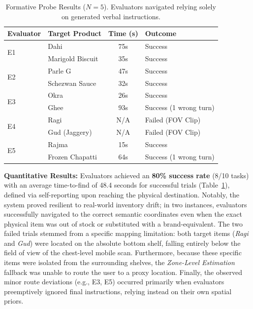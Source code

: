 \documentclass[sigconf,anonymous,review]{acmart}
\begin{document}
\begin{table}[h]
\centering
\caption{Formative Probe Results ($N=5$). Evaluators navigated relying solely on generated verbal instructions.}
\label{tab:user_study}
\small
\begin{tabular}{llcl}
\toprule
\textbf{Evaluator} & \textbf{Target Product} & \textbf{Time (s)} & \textbf{Outcome} \\
\midrule
\multirow{2}{*}{E1} & Dahi             & 75s & Success \\
                    & Marigold Biscuit & 35s & Success \\
\midrule
\multirow{2}{*}{E2} & Parle G          & 47s & Success \\
                    & Schezwan Sauce   & 32s & Success \\
\midrule
\multirow{2}{*}{E3} & Okra             & 26s & Success \\
                    & Ghee             & 93s & Success (1 wrong turn) \\
\midrule
\multirow{2}{*}{E4} & Ragi             & N/A & Failed (FOV Clip) \\
                    & Gud (Jaggery)    & N/A & Failed (FOV Clip) \\
\midrule
\multirow{2}{*}{E5} & Rajma            & 15s & Success \\
                    & Frozen Chapatti  & 64s & Success (1 wrong turn) \\
\bottomrule
\end{tabular}
\end{table}

\textbf{Quantitative Results:} Evaluators achieved an \textbf{80\% success rate} (8/10 tasks) with an average time-to-find of 48.4 seconds for successful trials (Table~\ref{tab:user_study}), defined via self-reporting upon reaching the physical destination. Notably, the system proved resilient to real-world inventory drift; in two instances, evaluators successfully navigated to the correct semantic coordinates even when the exact physical item was out of stock or substituted with a brand-equivalent. The two failed trials stemmed from a specific mapping limitation: both target items (\textit{Ragi} and \textit{Gud}) were located on the absolute bottom shelf, falling entirely below the field of view of the chest-level mobile scan. Furthermore, because these specific items were isolated from the surrounding shelves, the \emph{Zone-Level Estimation} fallback was unable to route the user to a proxy location. Finally, the observed minor route deviations (e.g., E3, E5) occurred primarily when evaluators preemptively ignored final instructions, relying instead on their own spatial priors.
\end{document}
